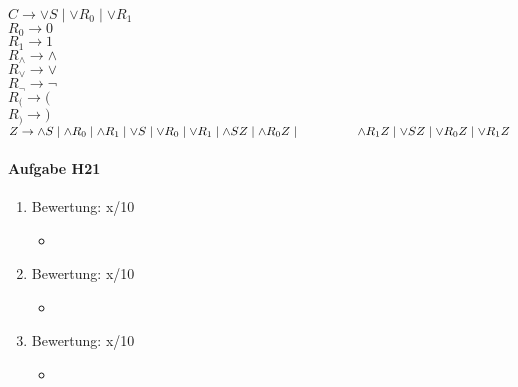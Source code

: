 \documentclass[11pt]{article}
\begin{document}
\begin{enumerate}
\begin{itemize}
\\\hspace*{6mm} $C \rightarrow \vee S \mid \vee R_{0} \mid \vee R_{1}$
\\\hspace*{6mm} $R_{0} \rightarrow 0$
\\\hspace*{6mm} $R_{1} \rightarrow 1$
\\\hspace*{6mm} $R_{\wedge} \rightarrow \wedge$
\\\hspace*{6mm} $R_{\vee} \rightarrow \vee$
\\\hspace*{6mm} $R_{\neg} \rightarrow \neg$
\\\hspace*{6mm} $R_{(} \rightarrow ($
\\\hspace*{6mm} $R_{)} \rightarrow )$
\\\hspace*{6mm} $Z \rightarrow \wedge S \mid \wedge R_{0} \mid \wedge R_{1} \mid \vee S \mid \vee R_{0} \mid \vee R_{1} \mid \wedge SZ \mid \wedge R_{0}Z \mid \hspace*{16,5mm} \wedge R_{1}Z \mid \vee SZ \mid \vee R_{0}Z \mid \vee R_{1}Z$

\end{itemize} 
\end{enumerate}


\paragraph{Aufgabe H21}
\begin{enumerate}[label=\alph*)]
\item Bewertung: x/10
\begin{itemize}
\item 
\end{itemize}

\item Bewertung: x/10
\begin{itemize}
\item
\end{itemize}

\item Bewertung: x/10
\begin{itemize}
\item
\end{itemize}
\end{enumerate}
\end{document}
